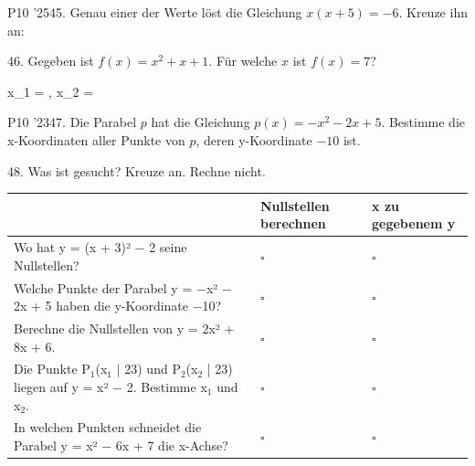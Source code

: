 \documentclass[11pt]{article}
\begin{document}
\pfgruppe{}
\begin{pfaufg}{P10 ’25}{45.}{}
Genau einer der Werte löst die Gleichung $x(x+5) = -6$. Kreuze ihn an:
\end{pfaufg}
\pfgruppe{}
\begin{pfaufg}{}{46.}{}
Gegeben ist $f(x) = x^2 + x + 1$. Für welche $x$ ist $f(x) = 7$?
\par\noindent x\_1 = \leerfeld , x\_2 = \leerfeld \par
{}
\end{pfaufg}
\pfgruppe{}
\begin{pfaufg}{P10 ’23}{\llap{\textasteriskcentered\,}47.}{}
Die Parabel $p$ hat die Gleichung $p(x) = -x^2 - 2x + 5$. Bestimme die x-Koordinaten aller Punkte von $p$, deren y-Koordinate $-10$ ist.
\end{pfaufg}
\par\Needspace*{0.55\textheight}
\begin{pfaufg}{}{48.}{}
Was ist gesucht? Kreuze an. Rechne nicht.
\par\smallskip\noindent \begingroup\renewcommand{\arraystretch}{1.4}\begin{tabular}{|>{\raggedright\arraybackslash}p{8.3cm}|>{\centering\arraybackslash\hyphenpenalty=0}p{1.55cm}|>{\centering\arraybackslash\hyphenpenalty=0}p{1.55cm}|}\hline  & {\scriptsize\hspace{0pt}Nullstellen berechnen} & {\scriptsize\hspace{0pt}x zu gegebenem y} \\ \hline Wo hat y = (x + 3)² $-$ 2 seine Nullstellen? & $\square$ & $\square$ \\ \hline Welche Punkte der Parabel y = $-$x² $-$ 2x + 5 haben die y-Koordinate $-$10? & $\square$ & $\square$ \\ \hline Berechne die Nullstellen von y = 2x² + 8x + 6. & $\square$ & $\square$ \\ \hline Die Punkte P$_1$(x$_1$ | 23) und P$_2$(x$_2$ | 23) liegen auf y = x² $-$ 2. Bestimme x$_1$ und x$_2$. & $\square$ & $\square$ \\ \hline In welchen Punkten schneidet die Parabel y = x² $-$ 6x + 7 die x-Achse? & $\square$ & $\square$ \\ \hline\end{tabular}\endgroup\par
\end{pfaufg}
\end{document}
